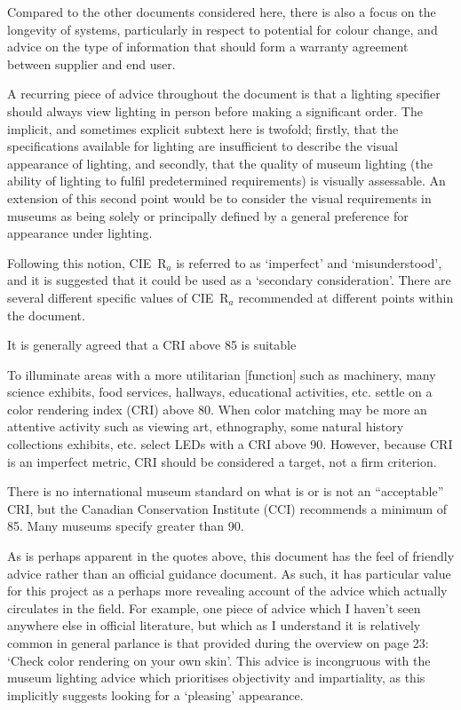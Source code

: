 Compared to the other documents considered here, there is also a focus on the longevity of systems, particularly in respect to potential for colour change, and advice on the type of information that should form a warranty agreement between supplier and end user.

A recurring piece of advice throughout the document is that a lighting specifier should always view lighting in person before making a significant order. The implicit, and sometimes explicit subtext here is twofold; firstly, that the specifications available for lighting are insufficient to describe the visual appearance of lighting, and secondly, that the quality of museum lighting (the ability of lighting to fulfil predetermined requirements) is visually assessable. An extension of this second point would be to consider the visual requirements in museums as being solely or principally defined by a general preference for appearance under lighting.

Following this notion, \gls{CIE}~R$_a$ is referred to as `imperfect' and `misunderstood', and it is suggested that it could be used as a `secondary consideration'. There are several different specific values of \gls{CIE}~R$_a$ recommended at different points within the document.

\begin{itquote}{}
It is generally agreed that a \gls{CRI} above 85 is suitable
\end{itquote}
\begin{itquote}{}
To illuminate areas with a more utilitarian [function] such as machinery, many science exhibits, food services, hallways, educational activities, etc. settle on a color rendering index (\gls{CRI}) above 80. When color matching may be more an attentive activity such as viewing art, ethnography, some natural history collections exhibits, etc. select \glspl{LED} with a \gls{CRI} above 90. However, because \gls{CRI} is an imperfect metric, \gls{CRI} should be considered a target, not a firm criterion.
\end{itquote}
\begin{itquote}{}
There is no international museum standard on what is or is not an ``acceptable'' \gls{CRI}, but the Canadian Conservation Institute (CCI) recommends a minimum of 85. Many museums specify greater than 90.
\end{itquote}

As is perhaps apparent in the quotes above, this document has the feel of friendly advice rather than an official guidance document. As such, it has particular value for this project as a perhaps more revealing account of the advice which actually circulates in the field. For example, one piece of advice which I haven't seen anywhere else in official literature, but which as I understand it is relatively common in general parlance is that provided during the overview on page 23: `Check color rendering on your own skin'. This advice is incongruous with the museum lighting advice which prioritises objectivity and impartiality, as this implicitly suggests looking for a `pleasing' appearance.

